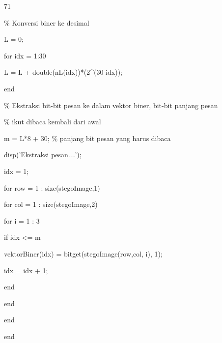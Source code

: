 \documentclass{article}
\begin{document}

71

\% Konversi biner ke desimal

L = 0;

for idx = 1:30     

L = L + double(nL(idx))*(2\textasciicircum{}(30-idx)); 

end   


\% Ekstraksi bit-bit pesan ke dalam vektor biner, bit-bit panjang pesan

\% ikut dibaca kembali dari awal

m = L*8 + 30;  \% panjang bit pesan yang harus dibaca 

disp('Ekstraksi pesan....');

idx = 1;

for row = 1 : size(stegoImage,1)

    for col = 1 : size(stegoImage,2)

        for i = 1 : 3

            if idx <= m

               vektorBiner(idx) = bitget(stegoImage(row,col, i), 1);

               idx = idx + 1;

            end   

        end

    end

end
\end{document}
